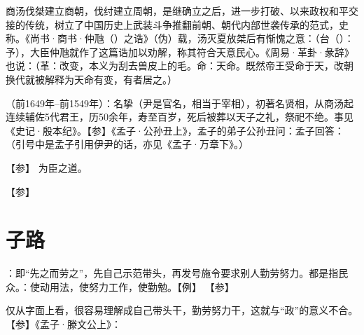 {
商汤伐桀建立商朝，伐纣建立周朝，是继确立之后，进一步打破、以来政权和平交接的传统，树立了中国历史上武装斗争推翻前朝、朝代内部世袭传承的范式，史称。《尚书·商书·仲虺（）之诰》（伪）载，汤灭夏放桀后有惭愧之意：（台（）：予），大臣仲虺就作了这篇诰加以劝解，称其符合天意民心。《周易·革卦·彖辞》也说：（革：改变，本义为刮去兽皮上的毛。命：天命。既然帝王受命于天，改朝换代就被解释为天命有变，有者居之。）

\item {}（前1649年--前1549年）：名挚（尹是官名，相当于宰相），初著名贤相，从商汤起连续辅佐5代君王，历50余年，寿至百岁，死后被葬以天子之礼，祭祀不绝。事见《史记·殷本纪》。【参】《孟子·公孙丑上》，孟子的弟子公孙丑问：孟子回答：（引号中是孟子引用伊尹的话，亦见《孟子·万章下》。）
}
{}  %


{
【参】 为臣之道。
}
{}


{
【参】
}
{}


\chapter{子路}

{
\item {}：即“先之而劳之”，先自己示范带头，再发号施令要求别人勤劳努力。都是指民众。：使动用法，使努力工作，使勤勉。【例】 【参】

仅从字面上看，很容易理解成自己带头干，勤劳努力干，这就与“政”的意义不合。【参】《孟子·滕文公上》：
}
{}


